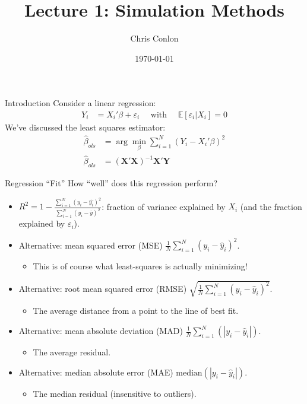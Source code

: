 \documentclass[aspectratio=169]{beamer}
\title{Lecture 1: Simulation Methods}
\author{Chris Conlon }
\institute{NYU Stern }
\date{\today}
\begin{document}
\maketitle

\begin{frame}{Introduction}
Consider a linear regression:
\begin{align*}
Y_{i} &= X_{i}'\beta + \varepsilon_{i} \quad \text{ with } \quad \mathbb{E}[\varepsilon_i | X_i]=0 
\end{align*}
We've discussed the \alert{least squares estimator}:
\begin{align*}
\widehat{\beta}_{ols} &= \arg \min_{\beta} \sum_{i=1}^N (Y_i - X_i' \beta)^2\\
\widehat{\beta}_{ols} &= (\mathbf{X}'\mathbf{X})^{-1} \mathbf{X}' \mathbf{Y}
\end{align*}
\end{frame}

\begin{frame}{Regression ``Fit''}
How ``well'' does this regression perform?
\begin{itemize}
\item $R^2 = 1 - \frac{\sum_{i=1}^N (y_i-\hat{y_i})^2}{\sum_{i=1}^N (y_i-\overline{y})^2}$: fraction of variance explained by $X_i$ (and the fraction explained by $\varepsilon_i$).
\item Alternative: \alert{mean squared error} (MSE) $\frac{1}{N}\sum_{i=1}^N (y_i -\hat{y}_i)^2$.
\begin{itemize}
\item This is of course what least-squares is actually minimizing!
\end{itemize}
\item Alternative: \alert{root mean squared error} (RMSE) $\sqrt{\frac{1}{N}\sum_{i=1}^N (y_i -\hat{y}_i)^2}$.
\begin{itemize}
\item The average distance from a point to the line of best fit.
\end{itemize}
\item Alternative: \alert{mean absolute deviation} (MAD) $ \frac{1}{N} \sum_{i=1}^N \left(| y_i -\hat{y}_i | \right)$.
\begin{itemize}
\item The average residual.
\end{itemize}
\item Alternative: \alert{median absolute error} (MAE) $ \text{median}\left(| y_i -\hat{y}_i| \right)$.
\begin{itemize}
\item The median residual (insensitive to outliers).
\end{itemize}
\end{itemize}


\end{frame}
\end{document}
